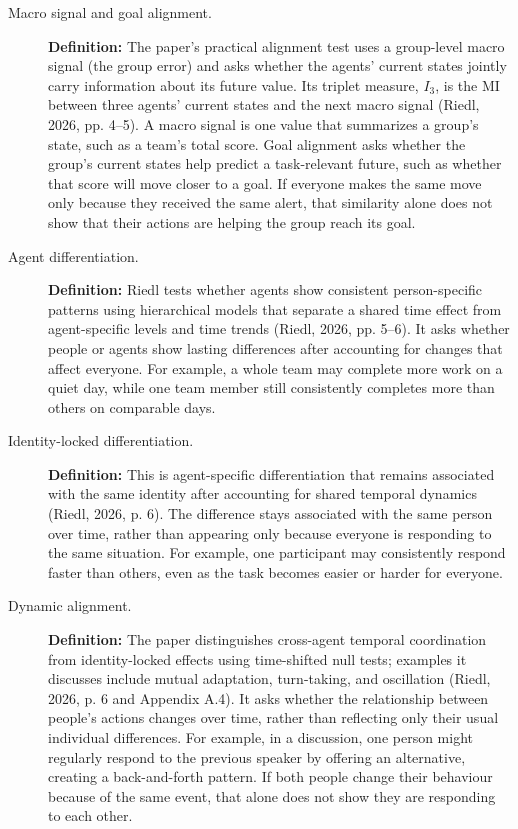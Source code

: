 \documentclass[12pt,a4paper,oneside]{report}
\begin{document}
\begin{description}
\item[Macro signal and goal alignment.]
\textbf{Definition:} The paper’s practical alignment test uses a group-level macro signal (the group error) and asks whether the agents’ current states jointly carry information about its future value. Its triplet measure, \(I_3\), is the MI between three agents’ current states and the next macro signal (Riedl, 2026, pp. 4–5).
A macro signal is one value that summarizes a group's state, such as a team's total score. Goal alignment asks whether the group's current states help predict a task-relevant future, such as whether that score will move closer to a goal. If everyone makes the same move only because they received the same alert, that similarity alone does not show that their actions are helping the group reach its goal.

\item[Agent differentiation.]
\textbf{Definition:} Riedl tests whether agents show consistent person-specific patterns using hierarchical models that separate a shared time effect from agent-specific levels and time trends (Riedl, 2026, pp. 5–6).
It asks whether people or agents show lasting differences after accounting for changes that affect everyone. For example, a whole team may complete more work on a quiet day, while one team member still consistently completes more than others on comparable days.

\item[Identity-locked differentiation.]
\textbf{Definition:} This is agent-specific differentiation that remains associated with the same identity after accounting for shared temporal dynamics (Riedl, 2026, p. 6).
The difference stays associated with the same person over time, rather than appearing only because everyone is responding to the same situation. For example, one participant may consistently respond faster than others, even as the task becomes easier or harder for everyone.

\item[Dynamic alignment.]
\textbf{Definition:} The paper distinguishes cross-agent temporal coordination from identity-locked effects using time-shifted null tests; examples it discusses include mutual adaptation, turn-taking, and oscillation (Riedl, 2026, p. 6 and Appendix A.4).
It asks whether the relationship between people's actions changes over time, rather than reflecting only their usual individual differences. For example, in a discussion, one person might regularly respond to the previous speaker by offering an alternative, creating a back-and-forth pattern. If both people change their behaviour because of the same event, that alone does not show they are responding to each other.


\end{description}
\end{document}
